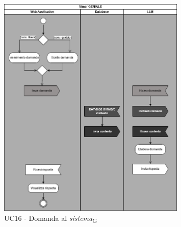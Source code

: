 \begin{figure}[H]
\centering
\includegraphics[width=0.8\textwidth]{contents/casi_duso/png/UC16_activity.png}
\caption{UC16 - Domanda al \textit{sistema}\textsubscript{G}}
\end{figure}

